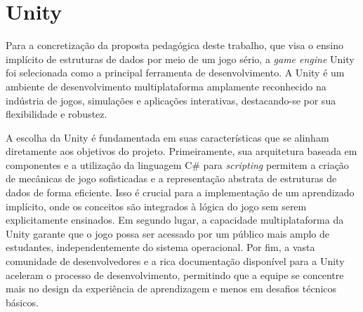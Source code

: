 \section{Unity}

Para a concretização da proposta pedagógica deste trabalho, que visa o ensino
implícito de estruturas de dados por meio de um jogo sério, a \emph{game engine}
Unity foi selecionada como a principal ferramenta de desenvolvimento. A Unity é
um ambiente de desenvolvimento multiplataforma amplamente reconhecido na
indústria de jogos, simulações e aplicações interativas, destacando-se por sua
flexibilidade e robustez.

A escolha da Unity é fundamentada em suas características que se alinham
diretamente aos objetivos do projeto. Primeiramente, sua arquitetura baseada em
componentes e a utilização da linguagem C\# para \emph{scripting} permitem a
criação de mecânicas de jogo sofisticadas e a representação abstrata de
estruturas de dados de forma eficiente. Isso é crucial para a implementação de
um aprendizado implícito, onde os conceitos são integrados à lógica do jogo sem
serem explicitamente ensinados. Em segundo lugar, a capacidade multiplataforma
da Unity garante que o jogo possa ser acessado por um público mais amplo de
estudantes, independentemente do sistema operacional. Por fim, a vasta
comunidade de desenvolvedores e a rica documentação disponível para a Unity
aceleram o processo de desenvolvimento, permitindo que a equipe se concentre
mais no design da experiência de aprendizagem e menos em desafios técnicos
básicos.
